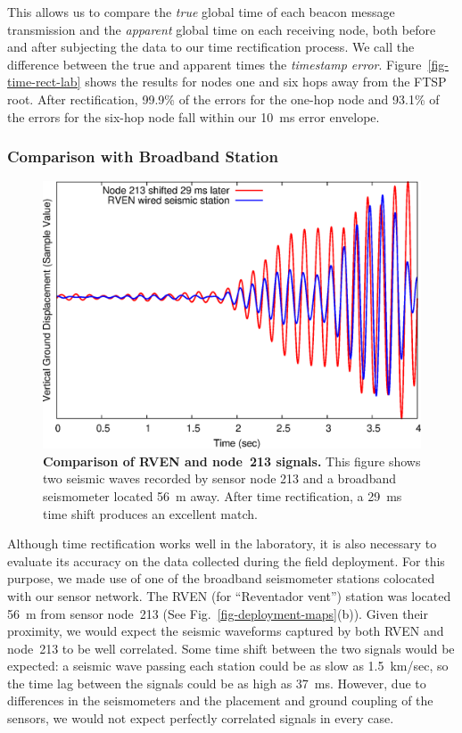 This allows us to compare the {\em true} global time of each beacon message
transmission and the {\em apparent} global time on each receiving node, both
before and after subjecting the data to our time rectification process.  We
call the difference between the true and apparent times the {\em timestamp
error}. Figure~\ref{fig-time-rect-lab} shows the results for nodes one and
six hops away from the FTSP root.  After rectification, 99.9\% of the errors
for the one-hop node and 93.1\% of the errors for the six-hop node fall
within our 10~ms error envelope.

\subsubsection{Comparison with Broadband Station}

\begin{figure}[t]
\begin{center}
\includegraphics[width=\hsize]{./figs/OSDI2006/2006-reftekTimingExample.eps}
\end{center}
\caption{{\bf Comparison of RVEN and node~213 signals.}
This figure shows two seismic waves recorded by sensor node 213 and a
broadband seismometer located 56~m away. After time rectification, a 29~ms
time shift produces an excellent match.}
\label{fig-reftektimingexample}
\end{figure}

Although time rectification works well in the laboratory, it is also
necessary to evaluate its accuracy on the data collected during the field
deployment. For this purpose, we made use of one of the broadband seismometer
stations colocated with our sensor network. The RVEN (for ``Reventador
vent'') station was located 56~m from sensor node~213 (See
Fig.~\ref{fig-deployment-maps}(b)).  Given their
proximity, we would expect the seismic waveforms captured by both RVEN and
node~213 to be well correlated.  Some time shift between the two signals
would be expected: a seismic wave passing each station could be as slow as
1.5~km/sec, so the time lag between the signals could be as high as 37~ms.
However, due to differences in the seismometers and the placement and ground
coupling of the sensors, we would not expect perfectly correlated signals in
every case.

